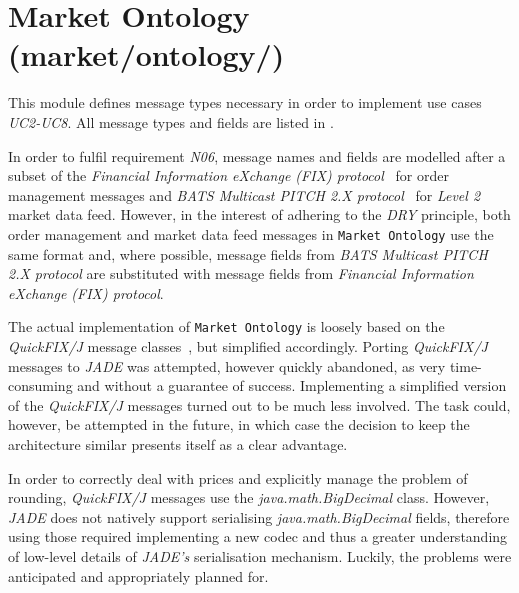 \section{Market Ontology (market/ontology/)}
This module defines message types necessary in order to implement use cases  \textit{UC2-UC8}. All message types and fields are listed in .

In order to fulfil requirement \textit{N06}, message names and fields are modelled after a subset of the \textit{Financial Information eXchange (FIX) protocol}~\cite{FIX5} for order management messages and \textit{BATS Multicast PITCH 2.X protocol}~\cite{BATSPITCH} for \textit{Level 2} market data feed. However, in the interest of adhering to the \textit{DRY} principle, both order management and market data feed messages in \texttt{Market Ontology} use the same format and, where possible, message fields from \textit{BATS Multicast PITCH 2.X protocol} are substituted with message fields from \textit{Financial Information eXchange (FIX) protocol}.

The actual implementation of \texttt{Market Ontology} is loosely based on the \textit{QuickFIX/J} message classes~\cite{QUICKFIXJ}, but simplified accordingly. Porting \textit{QuickFIX/J} messages to \textit{JADE} was attempted, however quickly abandoned, as very time-consuming and without a guarantee of success. Implementing a simplified version of the \textit{QuickFIX/J} messages turned out to be much less involved. The task could, however, be attempted in the future, in which case the decision to keep the architecture similar presents itself as a clear advantage. 

In order to correctly deal with prices and explicitly manage the problem of rounding, \textit{QuickFIX/J} messages use the \textit{java.math.BigDecimal} class. However, \textit{JADE} does not natively support serialising \textit{java.math.BigDecimal} fields, therefore using those required implementing a new codec and thus a greater understanding of low-level details of \textit{JADE's} serialisation mechanism. Luckily, the problems were anticipated and appropriately planned for.